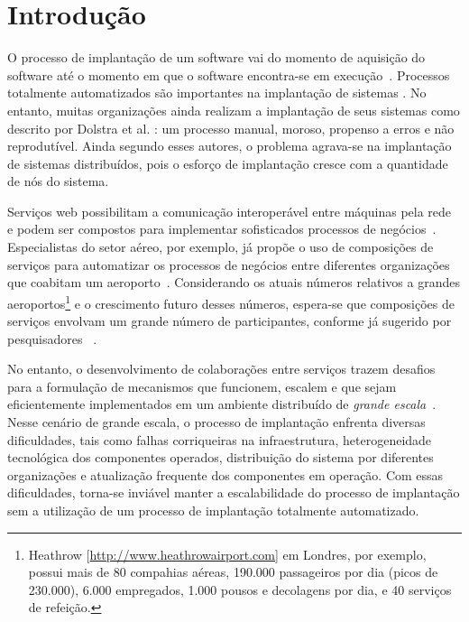 \chapter{Introdução}
\label{cap:introducao}

O processo de implantação de um software vai do momento de aquisição do software até o momento em que o software encontra-se em execução~\cite{DEPL2006}. Processos totalmente automatizados são importantes na implantação de sistemas \cite{Humble2011Continuous}. No entanto, muitas organizações ainda realizam a implantação de seus sistemas como descrito por Dolstra et al. \cite{Dolstra2005Configuration}: um processo manual, moroso, propenso a erros e não reprodutível. Ainda segundo esses autores, o problema agrava-se na implantação de sistemas distribuídos, pois o esforço de implantação cresce com a quantidade de nós do sistema. 


Serviços web possibilitam a comunicação interoperável entre máquinas pela rede~\cite{W3C2004WS}
e podem ser compostos para implementar sofisticados processos de negócios~\cite{Papazoglou2007State}.
Especialistas do setor aéreo, por exemplo, já propõe o uso de composições de serviços
para automatizar os processos de negócios entre diferentes organizações
que coabitam um aeroporto~\cite{Choreos2012D6.2}.
Considerando os atuais números relativos a grandes
aeroportos\footnote{Heathrow [\url{http://www.heathrowairport.com}] em Londres, por exemplo, 
possui mais de 80 compahias aéreas, 190.000 passageiros por dia (picos de 230.000),
6.000 empregados, 1.000 pousos e decolagens por dia, e 40 serviços de refeição.}
e o crescimento futuro desses números, espera-se que
composições de serviços envolvam um grande número de participantes,
conforme já sugerido por pesquisadores~\cite{Valerie2011FutureInternet} .

No entanto, o desenvolvimento de colaborações entre serviços 
trazem desafios para a formulação de mecanismos que funcionem, 
escalem e que sejam eficientemente implementados 
em um ambiente distribuído de \emph{grande escala}~\cite{Steen2011VeryLarge}.
Nesse cenário de grande escala,
o processo de implantação enfrenta diversas dificuldades, 
tais como falhas corriqueiras na infraestrutura, 
heterogeneidade tecnológica dos componentes operados, 
distribuição do sistema por diferentes organizações
e atualização frequente dos componentes em operação.
Com essas dificuldades, torna-se inviável manter a escalabilidade do processo de implantação
sem a utilização de um processo de implantação totalmente automatizado.

